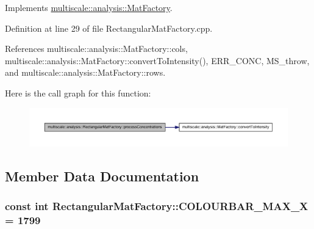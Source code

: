 \-Implements \hyperlink{classmultiscale_1_1analysis_1_1MatFactory_a0493c87d7b74619a95f14c0e31a3e178}{multiscale\-::analysis\-::\-Mat\-Factory}.



\-Definition at line 29 of file \-Rectangular\-Mat\-Factory.\-cpp.



\-References multiscale\-::analysis\-::\-Mat\-Factory\-::cols, multiscale\-::analysis\-::\-Mat\-Factory\-::convert\-To\-Intensity(), \-E\-R\-R\-\_\-\-C\-O\-N\-C, \-M\-S\-\_\-throw, and multiscale\-::analysis\-::\-Mat\-Factory\-::rows.



\-Here is the call graph for this function\-:
\nopagebreak
\begin{figure}[H]
\begin{center}
\leavevmode
\includegraphics[width=350pt]{classmultiscale_1_1analysis_1_1RectangularMatFactory_a6cc84a4eadbab5046cb6eacba64f5ae4_cgraph}
\end{center}
\end{figure}




\subsection{\-Member \-Data \-Documentation}
\hypertarget{classmultiscale_1_1analysis_1_1RectangularMatFactory_a9a91307705bb2d4cc8e837718ce330a8}{
\subsubsection[{\-C\-O\-L\-O\-U\-R\-B\-A\-R\-\_\-\-M\-A\-X\-\_\-\-X}]{\setlength{\rightskip}{0pt plus 5cm}const int {\bf \-Rectangular\-Mat\-Factory\-::\-C\-O\-L\-O\-U\-R\-B\-A\-R\-\_\-\-M\-A\-X\-\_\-\-X} = 1799}}\label{classmultiscale_1_1analysis_1_1RectangularMatFactory_a9a91307705bb2d4cc8e837718ce330a8}


